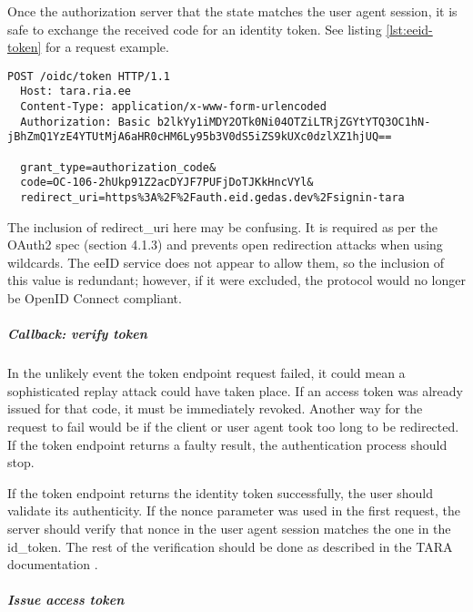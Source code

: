 Once the authorization server that the state matches the user agent session, it is safe to exchange the received code for an identity token. See listing \ref{lst:eeid-token} for a request example.

\begin{lstlisting}[caption={The eeID service token request}, label={lst:eeid-token}]
  POST /oidc/token HTTP/1.1
  Host: tara.ria.ee
  Content-Type: application/x-www-form-urlencoded
  Authorization: Basic b2lkYy1iMDY2OTk0Ni04OTZiLTRjZGYtYTQ3OC1hN-jBhZmQ1YzE4YTUtMjA6aHR0cHM6Ly95b3V0dS5iZS9kUXc0dzlXZ1hjUQ==

  grant_type=authorization_code&
  code=OC-106-2hUkp91Z2acDYJF7PUFjDoTJKkHncVYl&
  redirect_uri=https%3A%2F%2Fauth.eid.gedas.dev%2Fsignin-tara
\end{lstlisting}

The inclusion of redirect\_uri here may be confusing. It is required as per the OAuth2 spec (section 4.1.3) \cite{rfc6749} and prevents open redirection attacks when using wildcards. The eeID service does not appear to allow them, so the inclusion of this value is redundant; however, if it were excluded, the protocol would no longer be OpenID Connect compliant.

\subparagraph{Callback: verify token}

In the unlikely event the token endpoint request failed, it could mean a sophisticated replay attack could have taken place. If an access token was already issued for that code, it must be immediately revoked. Another way for the request to fail would be if the client or user agent took too long to be redirected. If the token endpoint returns a faulty result, the authentication process should stop.

If the token endpoint returns the identity token successfully, the user should validate its authenticity. If the nonce parameter was used in the first request, the server should verify that nonce in the user agent session matches the one in the id\_token. The rest of the verification should be done as described in the TARA documentation \cite{tara-technical}.


\subparagraph{Issue access token}

